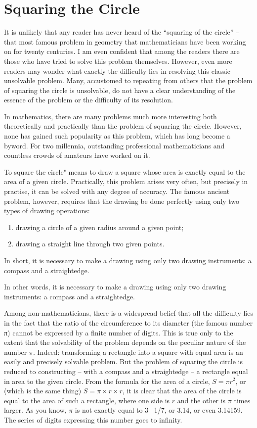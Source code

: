 \section{Squaring the Circle}
\label{sec-9.6}

It is unlikely that any reader has never heard of the ``squaring of the circle'' -- that most famous problem in geometry that mathematicians have been working on for twenty centuries. I am even confident that among the readers there are those who have tried to solve this problem themselves. However, even more readers may wonder what exactly the difficulty lies in resolving this classic unsolvable problem. Many, accustomed to repeating from others that the problem of squaring the circle is unsolvable, do not have a clear understanding of the essence of the problem or the difficulty of its resolution.

In mathematics, there are many problems much more interesting both theoretically and practically than the problem of squaring the circle. However, none has gained such popularity as this problem, which has long become a byword. For two millennia, outstanding professional mathematicians and countless crowds of amateurs have worked on it.

To square the circle" means to draw a square whose area is exactly equal to the area of a given circle. Practically, this problem arises very often, but precisely in practise, it can be solved with any degree of accuracy. The famous ancient problem, however, requires that the drawing be done perfectly using only two types of drawing operations: 
\begin{enumerate}
\item drawing a circle of a given radius around a given point; 
\item drawing a straight line through two given points.
\end{enumerate}
In short, it is necessary to make a drawing using only two drawing instruments: a compass and a straightedge.


In other words, it is necessary to make a drawing using only two drawing instruments: a compass and a straightedge.

Among non-mathematicians, there is a widespread belief that all the difficulty lies in the fact that the ratio of the circumference to its diameter (the famous number π) cannot be expressed by a finite number of digits. This is true only to the extent that the solvability of the problem depends on the peculiar nature of the number $\pi$. Indeed: transforming a rectangle into a square with equal area is an easily and precisely solvable problem. But the problem of squaring the circle is reduced to constructing -- with a compass and a straightedge -- a rectangle equal in area to the given circle. From the formula for the area of a circle, $S = \pi r^2$, or (which is the same thing) $S = \pi \times r \times r$, it is clear that the area of the circle is equal to the area of such a rectangle, where one side is $r$ and the other is $\pi$ times larger. As you know, $\pi$ is not exactly equal to 3 \, 1/7, or 3.14, or even 3.14159. The series of digits expressing this number goes to infinity.

